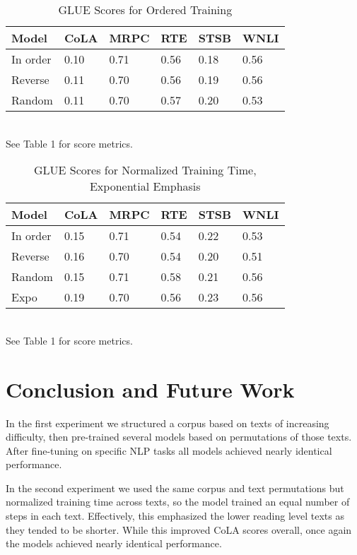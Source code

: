 \documentclass{article}
\begin{document}
\begin{table}
  \caption{GLUE Scores for Ordered Training}
  \label{sample-table}
  \centering
  \begin{tabular}{llllll}
    \toprule
    \cmidrule(r){1-2}
    Model & CoLA & MRPC & RTE & STSB & WNLI\\
    \midrule
    In order & 0.10 & 0.71  & 0.56 & 0.18 & 0.56 \\
    Reverse  & 0.11 & 0.70  & 0.56 & 0.19 & 0.56 \\
    Random   & 0.11 & 0.70  & 0.57 & 0.20 & 0.53 \\
    \bottomrule
  \end{tabular}
  \\
  \smallskip
  \small{See Table 1 for score metrics.}
\end{table}

\begin{table}
  \caption{GLUE Scores for Normalized Training Time, Exponential Emphasis}
  \label{sample-table}
  \centering
  \begin{tabular}{llllll}
    \toprule
    \cmidrule(r){1-2}
    Model & CoLA & MRPC & RTE & STSB & WNLI\\
    \midrule
    In order & 0.15 & 0.71  & 0.54 & 0.22 & 0.53 \\
    Reverse  & 0.16 & 0.70  & 0.54 & 0.20 & 0.51  \\
    Random   & 0.15 & 0.71  & 0.58 & 0.21 & 0.56 \\
    Expo     & 0.19 & 0.70  & 0.56 & 0.23 & 0.56 \\
    \bottomrule
  \end{tabular}
  \\
  \smallskip
  \small{See Table 1 for score metrics.}
\end{table}

\section{Conclusion and Future Work}

In the first experiment we structured a corpus based on texts of increasing difficulty, then pre-trained several models based on permutations of those texts. After fine-tuning on specific NLP tasks all models achieved nearly identical performance. 

In the second experiment we used the same corpus and text permutations but normalized training time across texts, so the model trained an equal number of steps in each text. Effectively, this emphasized the lower reading level texts as they tended to be shorter. While this improved CoLA scores overall, once again the models achieved nearly identical performance.
\end{document}
